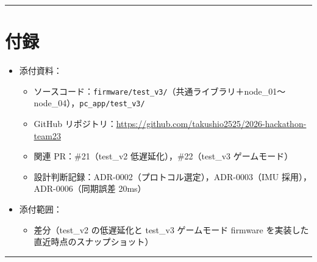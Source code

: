 \documentclass[uplatex,dvipdfmx,a4paper,11pt]{jsarticle}
\newcommand{\sectionrule}{\par\medskip\noindent\rule{\linewidth}{0.6pt}\par\medskip}
\begin{document}
\sectionrule

\section{付録}

\begin{itemize}
  \item 添付資料：
    \begin{itemize}
      \item ソースコード：\texttt{firmware/test\_v3/}（共通ライブラリ＋node\_01〜node\_04），\texttt{pc\_app/test\_v3/}
      \item GitHub リポジトリ：\url{https://github.com/takushio2525/2026-hackathon-team23}
      \item 関連 PR：\#21（test\_v2 低遅延化），\#22（test\_v3 ゲームモード）
      \item 設計判断記録：ADR-0002（プロトコル選定），ADR-0003（IMU 採用），ADR-0006（同期誤差 20ms）
    \end{itemize}
  \item 添付範囲：
    \begin{itemize}
      \item 差分（test\_v2 の低遅延化と test\_v3 ゲームモード firmware を実装した直近時点のスナップショット）
    \end{itemize}
\end{itemize}

\sectionrule
\end{document}
